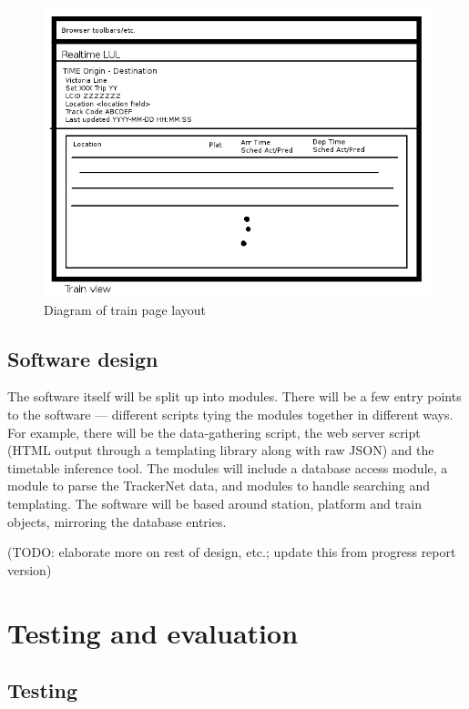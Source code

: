 \documentclass[a4paper,12pt]{article}
\begin{document}
\begin{figure}[h]
  \centering
  \includegraphics[width=\linewidth]{screen3}
  \caption{Diagram of train page layout}
  \label{fig:screen3}
\end{figure}

\subsection{Software design}

The software itself will be split up into modules. There will be a few entry
points to the software --- different scripts tying the modules together in
different ways. For example, there will be the data-gathering script, the web
server script (HTML output through a templating library along with raw JSON)
and the timetable inference tool. The modules will include a database access
module, a module to parse the TrackerNet data, and modules to handle searching
and templating. The software will be based around station, platform and train
objects, mirroring the database entries.

(TODO: elaborate more on rest of design, etc.; update this from progress report
version)

\section{Testing and evaluation}

\subsection{Testing}
\end{document}
